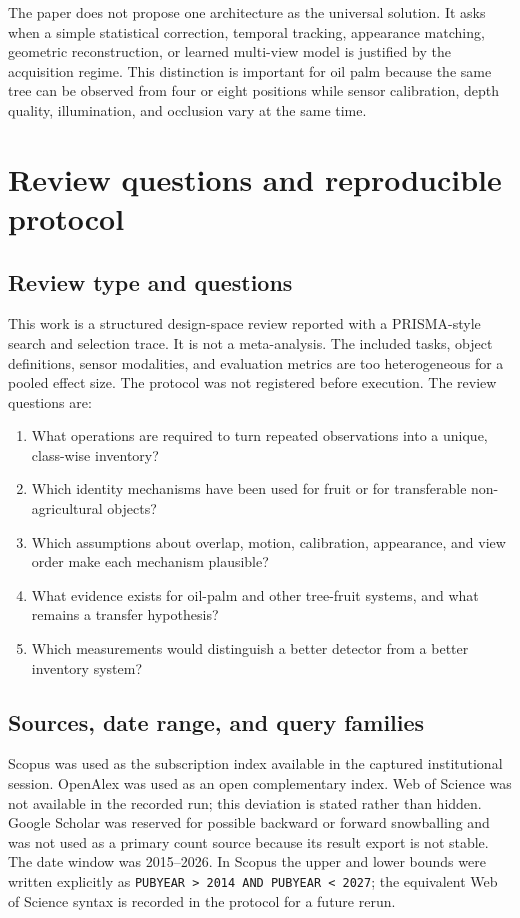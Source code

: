The paper does not propose one architecture as the universal solution. It asks when a simple statistical correction, temporal tracking, appearance matching, geometric reconstruction, or learned multi-view model is justified by the acquisition regime. This distinction is important for oil palm because the same tree can be observed from four or eight positions while sensor calibration, depth quality, illumination, and occlusion vary at the same time.

\section{Review questions and reproducible protocol}
\label{sec:protocol2}

\subsection{Review type and questions}

This work is a structured design-space review reported with a PRISMA-style search and selection trace. It is not a meta-analysis. The included tasks, object definitions, sensor modalities, and evaluation metrics are too heterogeneous for a pooled effect size. The protocol was not registered before execution. The review questions are:

\begin{enumerate}[leftmargin=*,itemsep=1pt]
  \item What operations are required to turn repeated observations into a unique, class-wise inventory?
  \item Which identity mechanisms have been used for fruit or for transferable non-agricultural objects?
  \item Which assumptions about overlap, motion, calibration, appearance, and view order make each mechanism plausible?
  \item What evidence exists for oil-palm and other tree-fruit systems, and what remains a transfer hypothesis?
  \item Which measurements would distinguish a better detector from a better inventory system?
\end{enumerate}

\subsection{Sources, date range, and query families}

Scopus was used as the subscription index available in the captured institutional session. OpenAlex was used as an open complementary index. Web of Science was not available in the recorded run; this deviation is stated rather than hidden. Google Scholar was reserved for possible backward or forward snowballing and was not used as a primary count source because its result export is not stable. The date window was 2015--2026. In Scopus the upper and lower bounds were written explicitly as \texttt{PUBYEAR > 2014 AND PUBYEAR < 2027}; the equivalent Web of Science syntax is recorded in the protocol for a future rerun.


